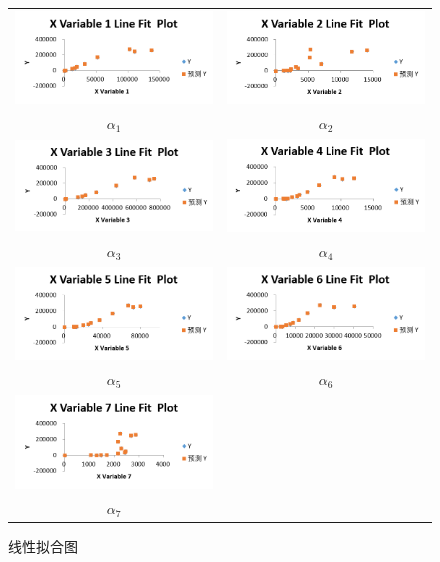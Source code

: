 \documentclass[12pt]{article}%
\begin{document}
\begin{figure}[htbp]
  \centering
  \begin{tabular}{cc}
  \includegraphics[width=.45\textwidth]{TIM20180704205802.png} & \includegraphics[width=.45\textwidth]{TIM20180704205833.png}\\
  $\alpha_1$&$\alpha_2$\\
  \includegraphics[width=.45\textwidth]{TIM20180704205915.png}&\includegraphics[width=.45\textwidth]{TIM20180704205938.png}\\
  $\alpha_3$&$\alpha_4$\\
    \includegraphics[width=.45\textwidth]{TIM20180704210023.png} & \includegraphics[width=.45\textwidth]{TIM20180704210058.png}\\
  $\alpha_5$&$\alpha_6$\\
  \includegraphics[width=.45\textwidth]{TIM20180704210136.png}&\ \\
  $\alpha_7$&\ 
  \end{tabular}
  \caption{线性拟合图} 
  \label{Line Fit  Plot} 
\end{figure}
\end{document}
